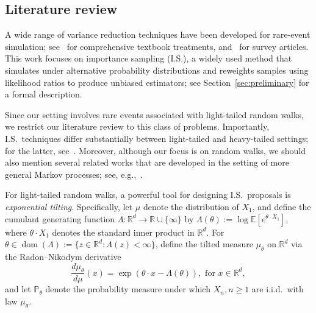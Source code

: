 \documentclass[aap,preprint]{imsart}
\newcommand{\bR}{{\mathbb{R}}}
\theoremstyle{plain}
\theoremstyle{definition}
\begin{document}
 
\subsection{Literature review}\label{subsec:literature_review}
A wide range of variance reduction techniques have been developed for rare-event simulation; see~\cite{alma992931930105151,glasserman2004monte,asmussen2007stochastic} for comprehensive textbook treatments, and~\cite{59428b60bd3211dc88d5000ea68e967b,juneja2006rare,blanchet2012state} for survey articles. This work focuses on importance sampling (I.S.), a widely used method that simulates under alternative probability distributions and reweights samples using likelihood ratios to produce unbiased estimators; see Section~\ref{sec:preliminary} for a formal description.

Since our setting involves rare events associated with light-tailed random walks, we restrict our literature review to this class of problems. Importantly, I.S.~techniques differ substantially between light-tailed and heavy-tailed settings; for the latter, see~\cite{blanchet2008efficient,blanchet2008state,blanchet2010efficient}. Moreover, although our focus is on random walks, we should also mention several related works that are developed in the setting of more general Markov processes; see, e.g.,~\cite{ney1987markovI,ney1987markovII,sadowsky1990large,bucklew1990monte,lehtonen1992asymptotically,glasserman1995analysis,sadowsky1996monte,collamore2002,blanchet2007fluid}.


For light-tailed random walks, a powerful tool for designing I.S.~proposals is \emph{exponential tilting}. Specifically, let $\mu$ denote the distribution of $X_1$, and define the cumulant generating function $\Lambda : \mathbb{R}^d \to \mathbb{R} \cup \{\infty\}$ by $\Lambda(\theta) := \log \mathbb{E}[e^{\theta \cdot X_1}]$, where $\theta \cdot X_1$ denotes the standard inner product in $\mathbb{R}^d$. For $\theta \in \operatorname{dom}(\Lambda) := \{z \in \mathbb{R}^d : \Lambda(z) < \infty\}$, define the tilted measure $\mu_\theta$ on $\mathbb{R}^d$ via the Radon--Nikodym derivative 
$$
\frac{d\mu_\theta}{d\mu}(x) = \exp\left(\theta \cdot x - \Lambda(\theta)\right), \text{ for } x \in \bR^d,
$$
and let $\mathbb{P}_\theta$ denote the probability measure under which $X_n, n \geq 1$ are i.i.d.\ with law $\mu_\theta$. 
\end{document}
